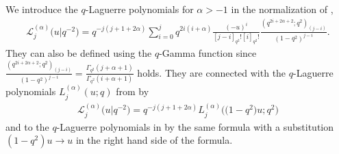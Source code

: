 \documentclass[pdftex]{sigma}
\newcommand{\cL}{\mathcal{L}}
\numberwithin{equation}{section}
\begin{document}
We introduce the $q$-Laguerre polynomials for $\alpha>-1$ in the normalization of \cite[p.~24]{MR2595267},
\begin{gather}
\label{qLaginv}
\cL^{(\alpha)}_j\big(u|q^{-2}\big) = q^{-j(j+1+2\alpha)}\sum_{i=0}^jq^{2i(i+\alpha)}\frac{(-u)^i}{[j-i]_{q^2}![i]_{q^2}!}\frac{(q^{2i+2\alpha+2};q^2)_{(j-i)}}{(1-q^2)^{j-i}}.
\end{gather}
They can also be def\/ined using the $q$-Gamma function since $\frac{(q^{2i+2\alpha+2};q^2)_{(j-i)}}{(1-q^2)^{j-i}}=\frac{\Gamma_{q^2}(j+\alpha+1)}{\Gamma_{q^2}(i+\alpha+1)}$ holds. They are connected with the $q$-Laguerre polynomials $L_j^{(\alpha)}(u;q)$ from \cite[Section~3.21]{Koekoek}  by
\begin{gather*}
\cL_j^{(\alpha)}\big(u|q^{-2}\big) = q^{-j(j+1+2\alpha)}L_j^{(\alpha)}\big(\big(1-q^2\big)u;q^2\big)
\end{gather*}
and to the $q$-Laguerre polynomials in \cite{MR0618759} by the same formula with a substitution  $(1-q^2)u\to u$ in the right hand side of the formula.
\end{document}
